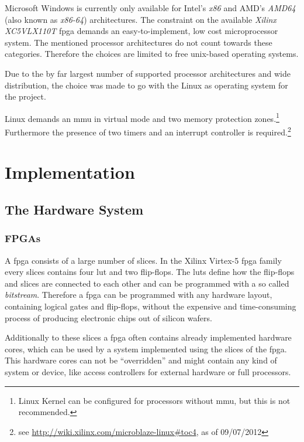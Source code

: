 Microsoft Windows is currently only available for Intel's \textit{x86} and AMD's \textit{AMD64} (also known as \textit{x86-64}) architectures. The constraint on the available \textit{Xilinx XC5VLX110T} \gls{fpga} demands an easy-to-implement, low cost microprocessor system. The mentioned processor architectures do not count towards these categories. Therefore the choices are limited to free unix-based operating systems.

Due to the by far largest number of supported processor architectures and wide distribution, the choice was made to go with the Linux as operating system for the project.

Linux demands an \gls{mmu} in virtual mode and two memory protection zones.\footnote{Linux Kernel can be configured for processors without \gls{mmu}, but this is not recommended.} Furthermore the presence of two timers and an interrupt controller is required.\footnote{see \url{http://wiki.xilinx.com/microblaze-linux\#toc4}, as of 09/07/2012}


\chapter{Implementation}

\section{The Hardware System}

\subsection{FPGAs}

A \gls{fpga} consists of a large number of slices. In the Xilinx Virtex-5 \gls{fpga} family every slices contains four \gls{lut} and two flip-flops. The \gls{lut}s define how the flip-flops and slices are connected to each other and can be programmed with a so called \textit{bitstream}. Therefore a \gls{fpga} can be programmed with any hardware layout, containing logical gates and flip-flops, without the expensive and time-consuming process of producing electronic chips out of silicon wafers.

Additionally to these slices a \gls{fpga} often contains already implemented hardware cores, which can be used by a system implemented using the slices of the \gls{fpga}. This hardware cores can not be "`overridden"' and might contain any kind of system or device, like access controllers for external hardware or full processors.

